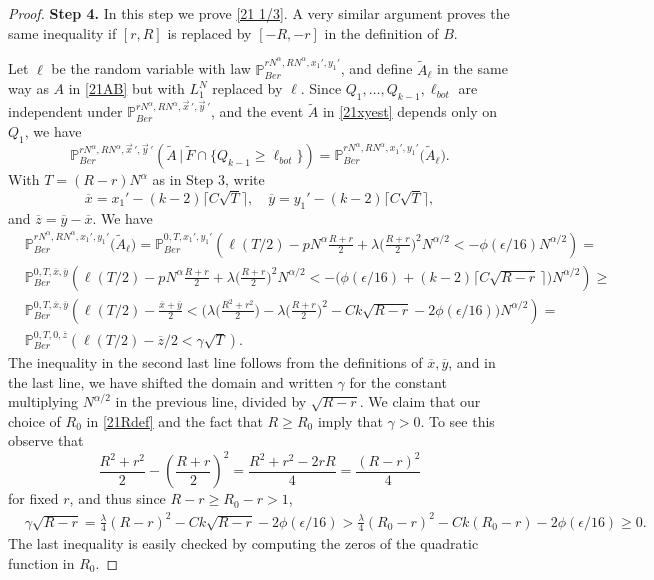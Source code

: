 \begin{proof}
		\noindent\textbf{Step 4.} In this step we prove \eqref{21 1/3}. A very similar argument proves the same inequality if $[r,R]$ is replaced by $[-R,-r]$ in the definition of $B$. 
		
		Let $\ell$ be the random variable with law $\mathbb{P}^{rN^\alpha,RN^\alpha,x_1',y_1'}_{Ber}$, and define $\tilde{A}_\ell$ in the same way as $A$ in \eqref{21AB} but with $L_1^N$ replaced by $\ell$. Since $Q_1,\dots,Q_{k-1},\ell_{bot}$ are independent under $\mathbb{P}^{rN^\alpha, RN^\alpha,\vec{x}\,',\vec{y}\,'}_{Ber}$, and the event $\tilde A$ in \eqref{21xyest} depends only on $Q_1$, we have
		\begin{equation}\label{21indep}
		\mathbb{P}^{rN^\alpha, RN^\alpha,\vec{x}\,',\vec{y}\,'}_{Ber}\left(\tilde A\,\big|\,\tilde F\cap \{ Q_{k-1} \geq \ell_{bot}\}\right) = \mathbb{P}^{rN^\alpha, RN^\alpha,x_1',y_1'}_{Ber}\big(\tilde{A}_\ell\big).
		\end{equation} 
		With $T=(R-r)N^\alpha$ as in Step 3, write
		\[
		\overline{x} = x_1' - (k-2)\lceil C\sqrt{T}\rceil, \quad \overline{y} = y_1' - (k-2)\lceil C\sqrt{T}\rceil,
		\] 
		and $\overline{z} = \overline{y}-\overline{x}$. We have
		\begin{equation} \label{21convex}
		\begin{split}
		& \mathbb{P}^{rN^\alpha, RN^\alpha,x_1',y_1'}_{Ber} \big(\tilde A_\ell\big)
		= \mathbb{P}^{0,T,x_1',y_1'}_{Ber} \left(\ell(T/2) - pN^\alpha \frac{R+r}{2} + \lambda\Big(\frac{R+r}{2}\Big)^2 N^{\alpha/2} < -\phi(\epsilon/16)N^{\alpha/2}\right) =\\
		& \mathbb{P}^{0,T,\overline{x},\overline{y}}_{Ber}\left(\ell(T/2) - pN^\alpha\frac{R+r}{2} + \lambda\Big(\frac{R+r}{2}\Big)^2 N^{\alpha/2} < -\big(\phi(\epsilon/16) + (k-2)\lceil C\sqrt{R-r}\,\rceil\big)N^{\alpha/2}\right) \geq\\
		& \mathbb{P}^{0,T,\overline{x},\overline{y}}_{Ber}\left(\ell(T/2) - \frac{\overline{x} + \overline{y}}{2} < \Big( \lambda\Big(\frac{R^2+r^2}{2}\Big) - \lambda\Big(\frac{R+r}{2}\Big)^2 - Ck\sqrt{R-r} - 2\phi(\epsilon/16)\Big)N^{\alpha/2}\right) = \\
		&\mathbb{P}^{0,T,0,\overline{z}}_{Ber}\left(\ell(T/2) - \overline{z}/2 < \gamma\sqrt{T}\right).
		\end{split}
		\end{equation}
		The inequality in the second last line follows from the definitions of $\overline{x},\overline{y}$, and in the last line, we have shifted the domain and written $\gamma$ for the constant multiplying $N^{\alpha/2}$ in the previous line, divided by $\sqrt{R-r}$. We claim that our choice of $R_0$ in \eqref{21Rdef} and the fact that $R\geq R_0$ imply that $\gamma > 0$. To see this observe that
		\[
		\frac{R^2+r^2}{2} - \left(\frac{R+r}{2}\right)^2 = \frac{R^2 + r^2-2rR}{4} = \frac{(R-r)^2}{4}
		\]
		for fixed $r$, and thus since $R-r \geq R_0-r > 1$,
		\begin{align*}
		&\gamma\sqrt{R-r} = \frac{\lambda}{4}(R-r)^2 - Ck\sqrt{R-r} - 2\phi(\epsilon/16) > \frac{\lambda}{4}(R_0-r)^2 - Ck(R_0-r) - 2\phi(\epsilon/16) \geq 0.
		\end{align*} 
		The last inequality is easily checked by computing the zeros of the quadratic function in $R_0$.
		

\end{proof}
